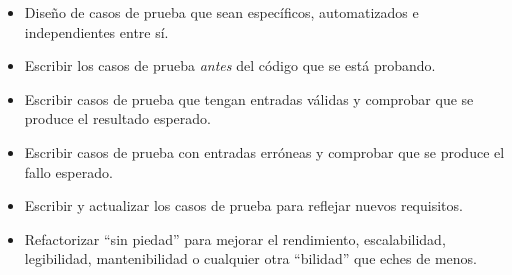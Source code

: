 \begin{itemize}

\item Diseño de casos de prueba que sean específicos, automatizados e independientes entre sí.

\item Escribir los casos de prueba \emph{antes} del código que se está probando.

\item Escribir casos de prueba que tengan entradas válidas y comprobar que se produce el resultado esperado.

\item Escribir casos de prueba con entradas erróneas y comprobar que se produce el fallo esperado.

\item Escribir y actualizar los casos de prueba para reflejar nuevos requisitos.

\item Refactorizar ``sin piedad'' para mejorar el rendimiento, escalabilidad, legibilidad, mantenibilidad o cualquier otra ``bilidad'' que eches de menos.

\end{itemize}
